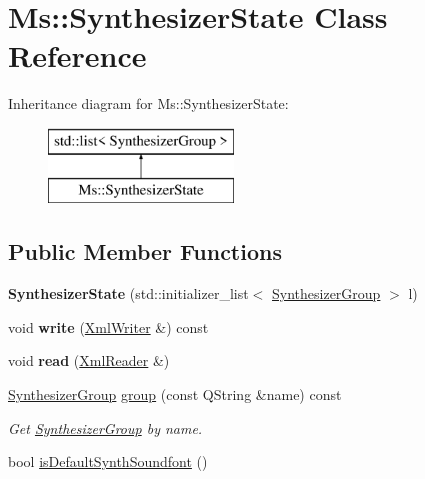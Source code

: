 \hypertarget{class_ms_1_1_synthesizer_state}{}\section{Ms\+:\+:Synthesizer\+State Class Reference}
\label{class_ms_1_1_synthesizer_state}
Inheritance diagram for Ms\+:\+:Synthesizer\+State\+:\begin{figure}[H]
\begin{center}
\leavevmode
\includegraphics[height=2.000000cm]{class_ms_1_1_synthesizer_state}
\end{center}
\end{figure}
\subsection*{Public Member Functions}
\begin{DoxyCompactItemize}
\item 
\mbox{\label{class_ms_1_1_synthesizer_state_a65321e96ef7a8ca623da0ce424d5ee08}} 
{\bfseries Synthesizer\+State} (std\+::initializer\+\_\+list$<$ \hyperlink{class_ms_1_1_synthesizer_group}{Synthesizer\+Group} $>$ l)
\item 
\mbox{\label{class_ms_1_1_synthesizer_state_aabc47251003d9131b6425b476bd7533a}} 
void {\bfseries write} (\hyperlink{class_ms_1_1_xml_writer}{Xml\+Writer} \&) const
\item 
\mbox{\label{class_ms_1_1_synthesizer_state_a0be2aab38a583681071e6e05d8162071}} 
void {\bfseries read} (\hyperlink{class_ms_1_1_xml_reader}{Xml\+Reader} \&)
\item 
\mbox{\label{class_ms_1_1_synthesizer_state_addbb693dd4dcdaf908c6c7a2046d2ff4}} 
\hyperlink{class_ms_1_1_synthesizer_group}{Synthesizer\+Group} \hyperlink{class_ms_1_1_synthesizer_state_addbb693dd4dcdaf908c6c7a2046d2ff4}{group} (const Q\+String \&name) const
\begin{DoxyCompactList}\small\item\em Get \hyperlink{class_ms_1_1_synthesizer_group}{Synthesizer\+Group} by name. \end{DoxyCompactList}\item 
bool \hyperlink{class_ms_1_1_synthesizer_state_aa308307dab5d80434cea75cff5355ad9}{is\+Default\+Synth\+Soundfont} ()
\end{DoxyCompactItemize}


